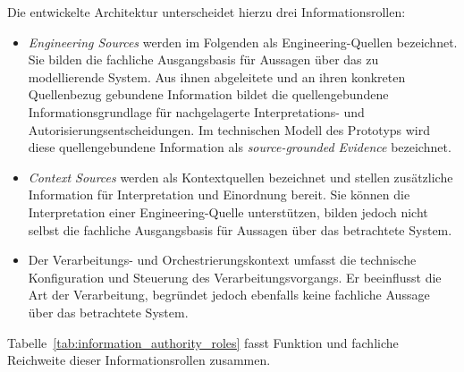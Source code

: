 Die entwickelte Architektur unterscheidet hierzu drei Informationsrollen:

\begin{itemize}
    \item \emph{Engineering Sources} werden im Folgenden als
    Engineering-Quellen bezeichnet. Sie bilden die fachliche Ausgangsbasis
    für Aussagen über das zu modellierende System. Aus ihnen abgeleitete und
    an ihren konkreten Quellenbezug gebundene Information bildet die
    quellengebundene Informationsgrundlage für nachgelagerte Interpretations-
    und Autorisierungsentscheidungen. Im technischen Modell des Prototyps wird
    diese quellengebundene Information als \emph{source-grounded Evidence}
    bezeichnet.

    \item \emph{Context Sources} werden als Kontextquellen bezeichnet und
    stellen zusätzliche Information für Interpretation und Einordnung bereit.
    Sie können die Interpretation einer Engineering-Quelle unterstützen,
    bilden jedoch nicht selbst die fachliche Ausgangsbasis für Aussagen über
    das betrachtete System.

    \item Der Verarbeitungs- und Orchestrierungskontext umfasst die technische
    Konfiguration und Steuerung des Verarbeitungsvorgangs. Er beeinflusst die
    Art der Verarbeitung, begründet jedoch ebenfalls keine fachliche Aussage
    über das betrachtete System.
\end{itemize}

\noindent Tabelle~\ref{tab:information_authority_roles} fasst Funktion und fachliche
Reichweite dieser Informationsrollen zusammen.

